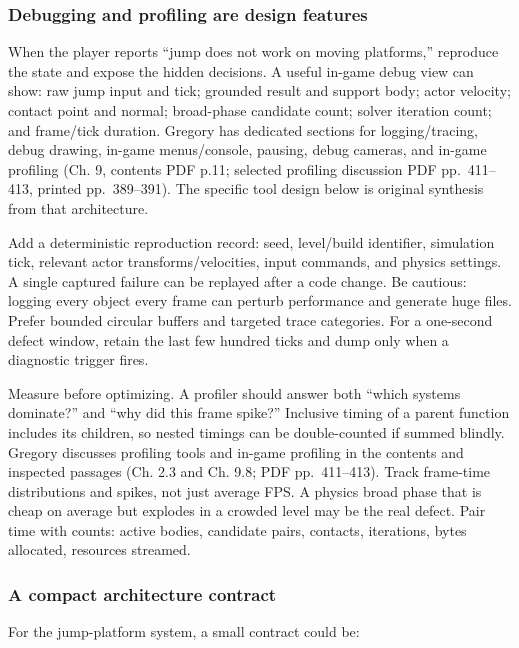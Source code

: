 \subsubsection{Debugging and profiling are design features}\label{debugging-and-profiling-are-design-features}

When the player reports ``jump does not work on moving platforms,'' reproduce the state and expose the hidden decisions. A useful in-game debug view can show: raw jump input and tick; grounded result and support body; actor velocity; contact point and normal; broad-phase candidate count; solver iteration count; and frame/tick duration. Gregory has dedicated sections for logging/tracing, debug drawing, in-game menus/console, pausing, debug cameras, and in-game profiling (Ch. 9, contents PDF p.11; selected profiling discussion PDF pp.~411--413, printed pp.~389--391). The specific tool design below is original synthesis from that architecture.

Add a deterministic reproduction record: seed, level/build identifier, simulation tick, relevant actor transforms/velocities, input commands, and physics settings. A single captured failure can be replayed after a code change. Be cautious: logging every object every frame can perturb performance and generate huge files. Prefer bounded circular buffers and targeted trace categories. For a one-second defect window, retain the last few hundred ticks and dump only when a diagnostic trigger fires.

Measure before optimizing. A profiler should answer both ``which systems dominate?'' and ``why did this frame spike?'' Inclusive timing of a parent function includes its children, so nested timings can be double-counted if summed blindly. Gregory discusses profiling tools and in-game profiling in the contents and inspected passages (Ch. 2.3 and Ch. 9.8; PDF pp.~411--413). Track frame-time distributions and spikes, not just average FPS. A physics broad phase that is cheap on average but explodes in a crowded level may be the real defect. Pair time with counts: active bodies, candidate pairs, contacts, iterations, bytes allocated, resources streamed.

\subsubsection{A compact architecture contract}\label{a-compact-architecture-contract}

For the jump-platform system, a small contract could be:


